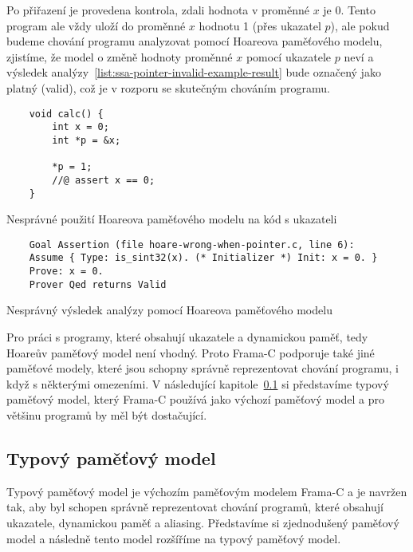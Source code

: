 Po přiřazení je provedena kontrola, zdali hodnota v proměnné $x$ je 0.
Tento program ale vždy uloží do proměnné $x$ hodnotu 1 (přes ukazatel $p$),
ale pokud budeme chování programu analyzovat pomocí Hoareova paměťového modelu,
zjistíme, že model o změně hodnoty proměnné $x$ pomocí ukazatele $p$ neví
a výsledek analýzy~\ref{list:ssa-pointer-invalid-example-result} bude označený jako platný (valid),
což je v rozporu se skutečným chováním programu.

\begin{listing}[H]
    \begin{verbatim}
    void calc() {
        int x = 0;
        int *p = &x;

        *p = 1;
        //@ assert x == 0;
    }
    \end{verbatim}
    \caption{Nesprávné použití Hoareova paměťového modelu na kód s ukazateli}
    \label{list:ssa-pointer-invalid-example}
\end{listing}

\begin{listing}[H]
    \begin{verbatim}
    Goal Assertion (file hoare-wrong-when-pointer.c, line 6):
    Assume { Type: is_sint32(x). (* Initializer *) Init: x = 0. }
    Prove: x = 0.
    Prover Qed returns Valid
    \end{verbatim}
    \caption{Nesprávný výsledek analýzy pomocí Hoareova paměťového modelu}
    \label{list:ssa-pointer-invalid-example-result}
\end{listing}

Pro práci s programy, které obsahují ukazatele a dynamickou paměť,
tedy Hoareův paměťový model není vhodný.
Proto Frama\mbox{-}C podporuje také jiné paměťové modely,
které jsou schopny správně reprezentovat chování programu, i když s některými omezeními.
V následující kapitole~\ref{subsec:typovy-pametovy-model} si představíme typový paměťový model,
který Frama\mbox{-}C používá jako výchozí paměťový model a pro většinu programů by měl být dostačující.

\subsection{Typový paměťový model}
\label{subsec:typovy-pametovy-model}


Typový paměťový model je výchozím paměťovým modelem Frama\mbox{-}C
a je navržen tak, aby byl schopen správně reprezentovat chování programů,
které obsahují ukazatele, dynamickou paměť a aliasing.
Představíme si zjednodušený paměťový model a následně tento model rozšíříme na typový paměťový model.


